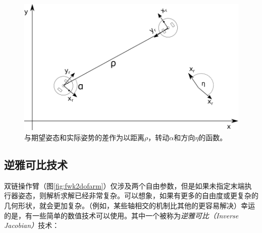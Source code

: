 \begin{figure}
	\centering
		\includegraphics[width=\textwidth]{figs/trajectorygen}
	\caption {与期望姿态和实际姿势的差作为以距离$\rho$，转动$\alpha$和方向$\eta$的函数。}
	\label{fig:trajectorygen}
\end{figure}



\subsection {逆雅可比技术}
\label{sec:invjac}
双链操作臂（图\ref{fig:fwk2dofarm}）仅涉及两个自由参数，但是如果未指定末端执行器姿态，则解析求解已经非常复杂。可以想象，如果有更多的自由度或更复杂的几何形状，就会更加复杂。（例如，某些轴相交的机制比其他的更容易解决）幸运的是，有一些简单的数值技术可以使用。其中一个被称为\emph{逆雅可比（Inverse Jacobian）}技术：


